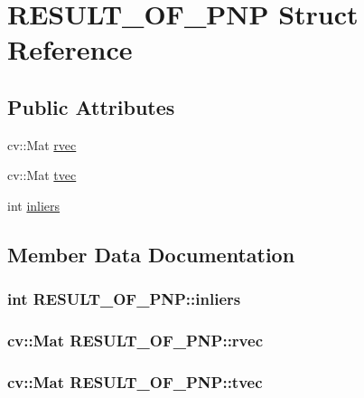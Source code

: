 \hypertarget{struct_r_e_s_u_l_t___o_f___p_n_p}{\section{R\-E\-S\-U\-L\-T\-\_\-\-O\-F\-\_\-\-P\-N\-P Struct Reference}
\label{struct_r_e_s_u_l_t___o_f___p_n_p}
}
\subsection*{Public Attributes}
\begin{DoxyCompactItemize}
\item 
cv\-::\-Mat \hyperlink{struct_r_e_s_u_l_t___o_f___p_n_p_a4b44dfaf3656deea8c690b890c125bf4}{rvec}
\item 
cv\-::\-Mat \hyperlink{struct_r_e_s_u_l_t___o_f___p_n_p_a24ae198a45aa4ce0aaf03a8d7e254582}{tvec}
\item 
int \hyperlink{struct_r_e_s_u_l_t___o_f___p_n_p_aca64d0f76dd144abfcecb6cfdc905ed1}{inliers}
\end{DoxyCompactItemize}


\subsection{Member Data Documentation}
\hypertarget{struct_r_e_s_u_l_t___o_f___p_n_p_aca64d0f76dd144abfcecb6cfdc905ed1}{
\subsubsection[{inliers}]{\setlength{\rightskip}{0pt plus 5cm}int R\-E\-S\-U\-L\-T\-\_\-\-O\-F\-\_\-\-P\-N\-P\-::inliers}}\label{struct_r_e_s_u_l_t___o_f___p_n_p_aca64d0f76dd144abfcecb6cfdc905ed1}
\hypertarget{struct_r_e_s_u_l_t___o_f___p_n_p_a4b44dfaf3656deea8c690b890c125bf4}{
\subsubsection[{rvec}]{\setlength{\rightskip}{0pt plus 5cm}cv\-::\-Mat R\-E\-S\-U\-L\-T\-\_\-\-O\-F\-\_\-\-P\-N\-P\-::rvec}}\label{struct_r_e_s_u_l_t___o_f___p_n_p_a4b44dfaf3656deea8c690b890c125bf4}
\hypertarget{struct_r_e_s_u_l_t___o_f___p_n_p_a24ae198a45aa4ce0aaf03a8d7e254582}{
\subsubsection[{tvec}]{\setlength{\rightskip}{0pt plus 5cm}cv\-::\-Mat R\-E\-S\-U\-L\-T\-\_\-\-O\-F\-\_\-\-P\-N\-P\-::tvec}}\label{struct_r_e_s_u_l_t___o_f___p_n_p_a24ae198a45aa4ce0aaf03a8d7e254582}


